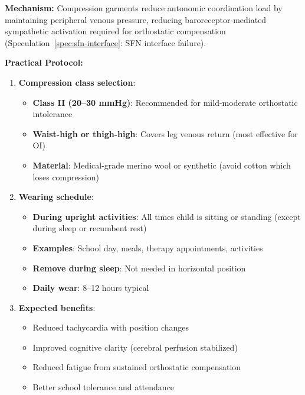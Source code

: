 \begin{recommendation}
\label{rec:compression-garments-mild-moderate}

\textbf{Mechanism:} Compression garments reduce autonomic coordination load by maintaining peripheral venous pressure, reducing baroreceptor-mediated sympathetic activation required for orthostatic compensation (Speculation~\ref{spec:sfn-interface}: SFN interface failure).

\textbf{Practical Protocol:}

\begin{enumerate}
    \item \textbf{Compression class selection}:
    \begin{itemize}
        \item \textbf{Class II (20--30 mmHg)}: Recommended for mild-moderate orthostatic intolerance
        \item \textbf{Waist-high or thigh-high}: Covers leg venous return (most effective for OI)
        \item \textbf{Material}: Medical-grade merino wool or synthetic (avoid cotton which loses compression)
    \end{itemize}

    \item \textbf{Wearing schedule}:
    \begin{itemize}
        \item \textbf{During upright activities}: All times child is sitting or standing (except during sleep or recumbent rest)
        \item \textbf{Examples}: School day, meals, therapy appointments, activities
        \item \textbf{Remove during sleep}: Not needed in horizontal position
        \item \textbf{Daily wear}: 8--12 hours typical
    \end{itemize}

    \item \textbf{Expected benefits}:
    \begin{itemize}
        \item Reduced tachycardia with position changes
        \item Improved cognitive clarity (cerebral perfusion stabilized)
        \item Reduced fatigue from sustained orthostatic compensation
        \item Better school tolerance and attendance
    \end{itemize}


\end{enumerate}
\end{recommendation}
